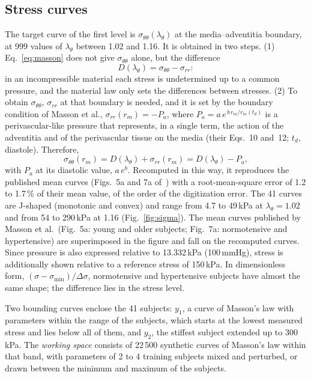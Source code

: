 \subsection{Stress curves}\label{sec:sigma}
The target curve of the first level is $\sigma_{\theta\theta}(\lambda_\theta)$ at the media--adventitia boundary, at 999 values of $\lambda_\theta$ between 1.02 and 1.16. It is obtained in two steps. (1) Eq.~\eqref{eq:masson} does not give $\sigma_{\theta\theta}$ alone, but the difference
\[
D(\lambda_\theta)=\sigma_{\theta\theta}-\sigma_{rr}:
\]
in an incompressible material each stress is undetermined up to a common pressure, and the material law only sets the differences between stresses. (2) To obtain $\sigma_{\theta\theta}$, $\sigma_{rr}$ at that boundary is needed, and it is set by the boundary condition of Masson et al., $\sigma_{rr}(r_m)=-P_a$, where $P_a=a\,e^{\,b\,r_m/r_m(t_d)}$ is a perivascular-like pressure that represents, in a single term, the action of the adventitia and of the perivascular tissue on the media (their Eqs.~10 and~12; $t_d$, diastole). Therefore,
\begin{equation}\label{eq:sigmaobj}
\sigma_{\theta\theta}(r_m)=D(\lambda_\theta)+\sigma_{rr}(r_m)=D(\lambda_\theta)-P_a,
\end{equation}
with $P_a$ at its diastolic value, $a\,e^{b}$. Recomputed in this way, it reproduces the published mean curves (Figs.~5a and 7a of~\cite{masson}) with a root-mean-square error of 1.2 to 1.7\,\% of their mean value, of the order of the digitization error. The 41 curves are J-shaped (monotonic and convex) and range from 4.7 to 49\,kPa at $\lambda_\theta=1.02$ and from 54 to 290\,kPa at 1.16 (Fig.~\ref{fig:sigma}). The mean curves published by Masson et al.\ (Fig.~5a: young and older subjects; Fig.~7a: normotensive and hypertensive) are superimposed in the figure and fall on the recomputed curves. Since pressure is also expressed relative to 13.332\,kPa (100\,mmHg), stress is additionally shown relative to a reference stress of 150\,kPa. In dimensionless form, $(\sigma-\sigma_{\min})/\Delta\sigma$, normotensive and hypertensive subjects have almost the same shape; the difference lies in the stress level.

Two bounding curves enclose the 41 subjects: $y_1$, a curve of Masson's law with parameters within the range of the subjects, which starts at the lowest measured stress and lies below all of them, and $y_2$, the stiffest subject extended up to 300\,kPa. The \emph{working space} consists of 22\,500 synthetic curves of Masson's law within that band, with parameters of 2 to 4 training subjects mixed and perturbed, or drawn between the minimum and maximum of the subjects.

